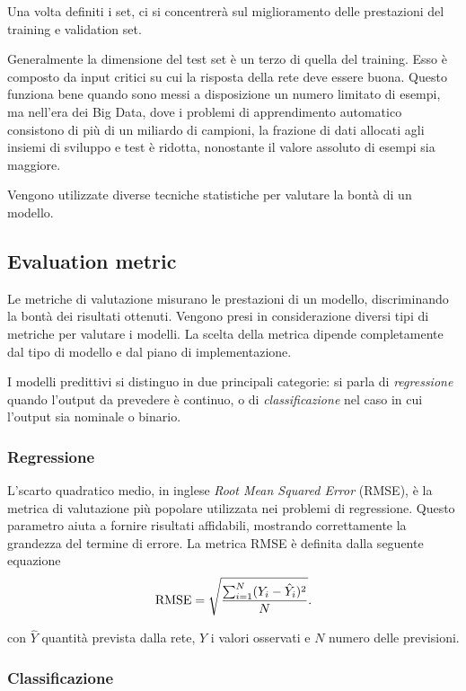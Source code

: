 Una volta definiti i set, ci si concentrerà sul miglioramento delle prestazioni del training e validation set. 

Generalmente la dimensione del test set è un terzo di quella del training. Esso è composto da input critici su cui la risposta della rete deve essere buona. 
Questo funziona bene quando sono messi a disposizione un numero limitato di esempi, ma nell'era dei Big Data, dove i problemi di apprendimento automatico consistono di più di un miliardo di campioni, la frazione di dati allocati agli insiemi di sviluppo e test è ridotta, nonostante il valore assoluto di esempi sia maggiore.

Vengono utilizzate diverse tecniche statistiche per valutare la bontà di un modello.

\subsection{Evaluation metric}
\label{subsec:EvaluationMetric}

Le metriche di valutazione misurano le prestazioni di un modello, discriminando la bontà dei risultati ottenuti.
Vengono presi in considerazione diversi tipi di metriche per valutare i modelli. La scelta della metrica dipende completamente dal tipo di modello e dal piano di implementazione. 

I modelli predittivi si distinguo in due principali categorie: si parla di \emph{regressione} quando l'output da prevedere è continuo, o di \emph{classificazione} nel caso in cui l'output sia nominale o binario. 
\subsubsection{Regressione}
\label{subsubsec:regressione}

L'{scarto quadratico medio}, in inglese \emph{Root Mean Squared Error} (RMSE), è la metrica di valutazione più popolare utilizzata nei problemi di regressione. Questo parametro aiuta a fornire risultati affidabili, mostrando correttamente la grandezza del termine di errore.
La metrica RMSE è definita dalla seguente equazione
\begin{equation}
	\operatorname{RMSE} = \sqrt{\frac{\sum_{i=1}^{N}({Y}_i - \hat{Y}_i)^2}{N}} \mbox{.}
	\label{eq:rmse}
\end{equation}

con $\hat{Y}$ quantità prevista dalla rete, $Y$ i valori osservati e $N$ numero delle previsioni.
\subsubsection{Classificazione}
\label{subsubsec:classificazione}


